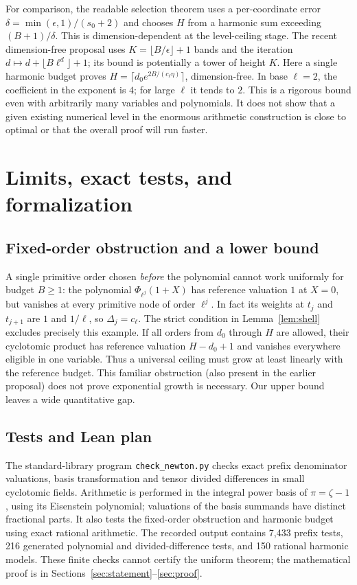\documentclass[11pt]{article}
\begin{document}
For comparison, the readable selection theorem uses a per-coordinate error $\delta=\min(\epsilon,1)/(s_0+2)$ and chooses $H$ from a harmonic sum exceeding $(B+1)/\delta$. This is dimension-dependent at the level-ceiling stage. The recent dimension-free proposal uses $K=\lfloor B/\epsilon\rfloor+1$ bands and the iteration $d\mapsto d+\lfloor B\ell^d\rfloor+1$; its bound is potentially a tower of height $K$. Here a single harmonic budget proves $H=\lceil d_0 e^{2B/(c_\ell\eta)}\rceil$, dimension-free. In base $\ell=2$, the coefficient in the exponent is $4$; for large $\ell$ it tends to $2$. This is a rigorous bound even with arbitrarily many variables and polynomials. It does not show that a given existing numerical level in the enormous arithmetic construction is close to optimal or that the overall proof will run faster.

\section{Limits, exact tests, and formalization}
\subsection*{Fixed-order obstruction and a lower bound}
A single primitive order chosen \emph{before} the polynomial cannot work uniformly for budget $B\ge1$: the polynomial $\Phi_{\ell^j}(1+X)$ has reference valuation $1$ at $X=0$, but vanishes at every primitive node of order $\ell^j$. In fact its weights at $t_j$ and $t_{j+1}$ are $1$ and $1/\ell$, so $\Delta_j=c_\ell$. The strict condition in Lemma~\ref{lem:shell} excludes precisely this example. If all orders from $d_0$ through $H$ are allowed, their cyclotomic product has reference valuation $H-d_0+1$ and vanishes everywhere eligible in one variable. Thus a universal ceiling must grow at least linearly with the reference budget. This familiar obstruction (also present in the earlier proposal) does not prove exponential growth is necessary. Our upper bound leaves a wide quantitative gap.

\subsection*{Tests and Lean plan}
The standard-library program \texttt{check\_newton.py} checks exact prefix denominator valuations, basis transformation and tensor divided differences in small cyclotomic fields. Arithmetic is performed in the integral power basis of $\pi=\zeta-1$, using its Eisenstein polynomial; valuations of the basis summands have distinct fractional parts. It also tests the fixed-order obstruction and harmonic budget using exact rational arithmetic. The recorded output contains 7,433 prefix tests, 216 generated polynomial and divided-difference tests, and 150 rational harmonic models. These finite checks cannot certify the uniform theorem; the mathematical proof is in Sections~\ref{sec:statement}--\ref{sec:proof}.
\end{document}
